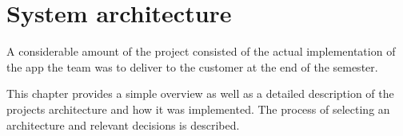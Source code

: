\chapter{System architecture}

A considerable amount of the project consisted of the actual implementation of the app the team was to deliver to the customer at the end of the semester. 

This chapter provides a simple overview as well as a detailed description of the projects architecture and how it was implemented. The process of selecting an architecture and relevant decisions is described.






